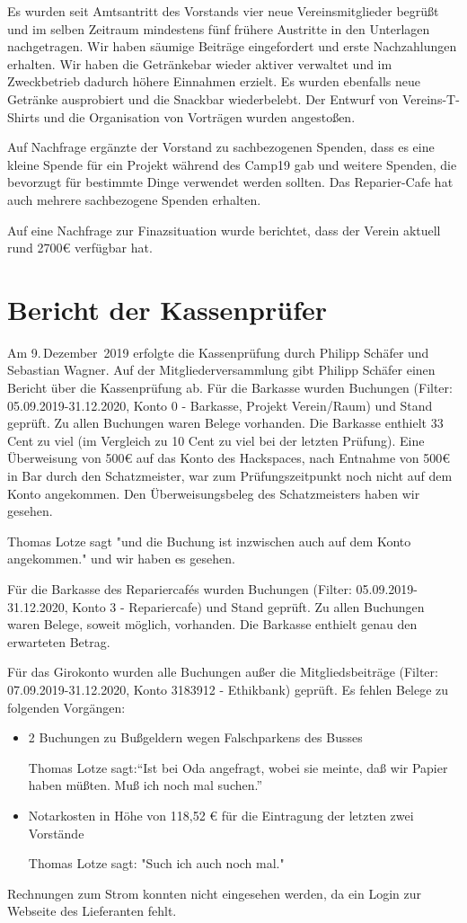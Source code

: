 \documentclass[DIV=calc,parksip=half*]{scrartcl}
\newcommand{\fiveop}{Philipp Schäfer}
\newcommand{\thomas}{Thomas Lotze}
\newcommand{\ckv}{Sebastian Wagner}
\begin{document}
Es wurden seit Amtsantritt des Vorstands vier neue Vereinsmitglieder begrüßt und im selben Zeitraum mindestens fünf frühere Austritte in den Unterlagen nachgetragen. Wir haben säumige Beiträge eingefordert und erste Nachzahlungen erhalten.
Wir haben die Getränkebar wieder aktiver verwaltet und im Zweckbetrieb dadurch höhere Einnahmen erzielt. Es wurden ebenfalls neue Getränke ausprobiert und die Snackbar wiederbelebt.
Der Entwurf von Vereins-T-Shirts und die Organisation von Vorträgen wurden angestoßen.

Auf Nachfrage ergänzte der Vorstand zu sachbezogenen Spenden, dass es eine kleine Spende für ein Projekt während des Camp19 gab und weitere Spenden, die bevorzugt für bestimmte Dinge verwendet werden sollten.
Das Reparier-Cafe hat auch mehrere sachbezogene Spenden erhalten.

Auf eine Nachfrage zur Finazsituation wurde berichtet, dass der Verein aktuell rund 2700€ verfügbar hat.
\section{Bericht der Kassenprüfer}
Am 9.\,Dezember~2019 erfolgte die Kassenprüfung durch \fiveop{} und  \ckv. Auf der
Mitgliederversammlung gibt \fiveop{} einen Bericht über die Kassenprüfung ab. Für die Barkasse wurden Buchungen (Filter: 05.09.2019-31.12.2020, Konto 0 - Barkasse, Projekt Verein/Raum) und Stand geprüft. Zu allen Buchungen waren Belege vorhanden. Die Barkasse enthielt 33 Cent zu viel (im Vergleich zu 10 Cent
zu viel bei der letzten Prüfung). Eine Überweisung von 500€ auf das Konto des Hackspaces, nach Entnahme von 500€ in Bar durch den Schatzmeister, war zum Prüfungszeitpunkt noch nicht auf dem Konto angekommen. Den Überweisungsbeleg des Schatzmeisters haben wir gesehen.

\thomas{} sagt "und die Buchung ist inzwischen auch auf dem Konto angekommen." und wir haben es gesehen.

Für die Barkasse des Repariercafés wurden Buchungen (Filter:
05.09.2019-31.12.2020, Konto 3 - Repariercafe) und Stand geprüft.
Zu allen Buchungen waren Belege, soweit möglich, vorhanden. Die Barkasse enthielt genau den erwarteten Betrag.


Für das Girokonto wurden alle Buchungen außer die Mitgliedsbeiträge (Filter:
07.09.2019-31.12.2020, Konto 3183912 - Ethikbank) geprüft. Es fehlen Belege zu
folgenden Vorgängen:
\begin{itemize}
 \item 2 Buchungen zu Bußgeldern wegen Falschparkens des Busses
 
 \thomas{} sagt:``Ist bei Oda angefragt, wobei sie meinte, daß wir Papier haben müßten. Muß ich noch mal suchen.''
 
 \item Notarkosten in Höhe von 118,52 € für die Eintragung der letzten zwei Vorstände

\thomas{} sagt: "Such ich auch noch mal."
\end{itemize}
Rechnungen zum Strom konnten nicht eingesehen werden, da ein Login zur Webseite des Lieferanten fehlt.
\end{document}
